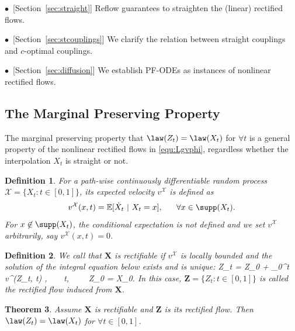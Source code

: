 \documentclass[11pt]{article}
\newtheorem{thm}{Theorem}[section]
\newtheorem{mydef}[thm]{Definition}
\newcommand{\X}{\mathcal{X}}
\newcommand{\E}{\mathbb{E}}
\newcommand{\vv}[1]{\boldsymbol{#1}}
\begin{document}
$\bullet$~[Section~\ref{sec:straight}] %
Reflow guarantees to straighten the (linear) rectified flows. 

$\bullet$~[Section~\ref{sec:stcouplings}] %
We clarify the relation between 
straight couplings and $c$-optimal couplings. 

$\bullet$~[Section~\ref{sec:diffusion}] We %
establish  PF-ODEs as instances of nonlinear rectified flows. 











 




 
 


\subsection{The Marginal Preserving Property}
\label{sec:marginal} 
The marginal preserving property that $\law(Z_t)=\law(X_t)$ for $\forall t$ is a general property of the nonlinear rectified flows in  \eqref{equ:Lgvphi},
regardless whether the interpolation $X_t$ is straight or not. 
\begin{mydef}
For a path-wise continuously differentiable random process  $\X = \{X_t\colon t\in[0,1]\}$, its expected velocity $v^\X$ is defined as 
$$v^\X(x, t) = 
\E[\dot X_t ~|~ X_t = x],~~~~~ \forall x\in \supp(X_t).
$$
For $x\not\in \supp(X_t)$, the conditional expectation is not defined and we set 
$v^\X$ arbitrarily, say $v^\X(x,t) = 0$. 
\end{mydef}

\begin{mydef}
We call that $\vv X$ is rectifiable if $v^\X$ is locally bounded and 
the solution of the integral equation below exists and  is unique: %
\bbb \label{equ:znonlinear} 
 Z_t = Z_0 + \int_0^t v^\X(Z_t, t) \dt,~~~~\forall t\in[0,1],~~~~ Z_0 = X_0.
\eee 
In this case, $\vv Z = \{Z_t\colon t\in[0,1]\}$ is called the rectified flow induced from $\vv X$. 
 \end{mydef}






\begin{thm}\label{thm:marginal}
Assume $\vv X$ is rectifiable and $\vv Z$ is its rectified flow. 
 Then  $\law(Z_t) =\law(X_t)$ for $\forall t\in[0,1]$. 
\end{thm}
\end{document}
